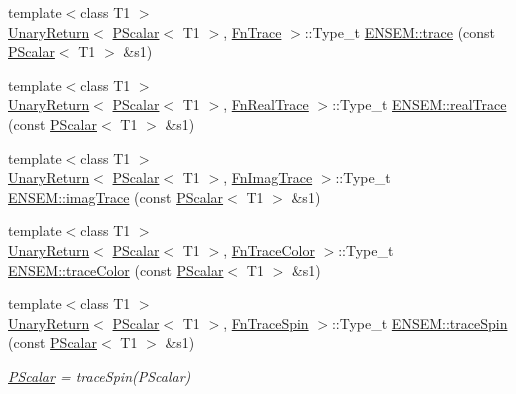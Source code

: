\begin{DoxyCompactItemize}
\item 
{\footnotesize template$<$class T1 $>$ }\\\mbox{\hyperlink{structENSEM_1_1UnaryReturn}{Unary\+Return}}$<$ \mbox{\hyperlink{classENSEM_1_1PScalar}{P\+Scalar}}$<$ T1 $>$, \mbox{\hyperlink{structENSEM_1_1FnTrace}{Fn\+Trace}} $>$\+::Type\+\_\+t \mbox{\hyperlink{group__primscalar_ga13a07d573bfefc0db7496d278c078a52}{E\+N\+S\+E\+M\+::trace}} (const \mbox{\hyperlink{classENSEM_1_1PScalar}{P\+Scalar}}$<$ T1 $>$ \&s1)
\item 
{\footnotesize template$<$class T1 $>$ }\\\mbox{\hyperlink{structENSEM_1_1UnaryReturn}{Unary\+Return}}$<$ \mbox{\hyperlink{classENSEM_1_1PScalar}{P\+Scalar}}$<$ T1 $>$, \mbox{\hyperlink{structENSEM_1_1FnRealTrace}{Fn\+Real\+Trace}} $>$\+::Type\+\_\+t \mbox{\hyperlink{group__primscalar_ga63efc63157b5fc9495798f0391c8e170}{E\+N\+S\+E\+M\+::real\+Trace}} (const \mbox{\hyperlink{classENSEM_1_1PScalar}{P\+Scalar}}$<$ T1 $>$ \&s1)
\item 
{\footnotesize template$<$class T1 $>$ }\\\mbox{\hyperlink{structENSEM_1_1UnaryReturn}{Unary\+Return}}$<$ \mbox{\hyperlink{classENSEM_1_1PScalar}{P\+Scalar}}$<$ T1 $>$, \mbox{\hyperlink{structENSEM_1_1FnImagTrace}{Fn\+Imag\+Trace}} $>$\+::Type\+\_\+t \mbox{\hyperlink{group__primscalar_gaf760659a12c2bd7668440d8b83333086}{E\+N\+S\+E\+M\+::imag\+Trace}} (const \mbox{\hyperlink{classENSEM_1_1PScalar}{P\+Scalar}}$<$ T1 $>$ \&s1)
\item 
{\footnotesize template$<$class T1 $>$ }\\\mbox{\hyperlink{structENSEM_1_1UnaryReturn}{Unary\+Return}}$<$ \mbox{\hyperlink{classENSEM_1_1PScalar}{P\+Scalar}}$<$ T1 $>$, \mbox{\hyperlink{structENSEM_1_1FnTraceColor}{Fn\+Trace\+Color}} $>$\+::Type\+\_\+t \mbox{\hyperlink{group__primscalar_gaf9f8817942b8ea7583ac7146ede1508f}{E\+N\+S\+E\+M\+::trace\+Color}} (const \mbox{\hyperlink{classENSEM_1_1PScalar}{P\+Scalar}}$<$ T1 $>$ \&s1)
\item 
{\footnotesize template$<$class T1 $>$ }\\\mbox{\hyperlink{structENSEM_1_1UnaryReturn}{Unary\+Return}}$<$ \mbox{\hyperlink{classENSEM_1_1PScalar}{P\+Scalar}}$<$ T1 $>$, \mbox{\hyperlink{structENSEM_1_1FnTraceSpin}{Fn\+Trace\+Spin}} $>$\+::Type\+\_\+t \mbox{\hyperlink{group__primscalar_gacb9de2d99f632eb0d424014a2afbdef7}{E\+N\+S\+E\+M\+::trace\+Spin}} (const \mbox{\hyperlink{classENSEM_1_1PScalar}{P\+Scalar}}$<$ T1 $>$ \&s1)
\begin{DoxyCompactList}\small\item\em \mbox{\hyperlink{classENSEM_1_1PScalar}{P\+Scalar}} = trace\+Spin(\+P\+Scalar) \end{DoxyCompactList}\item 

\end{DoxyCompactItemize}

